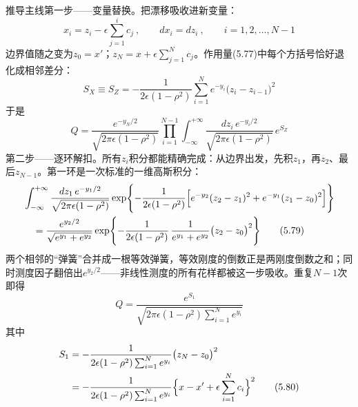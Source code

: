 推导主线第一步——变量替换。把漂移吸收进新变量：
\begin{equation*}
x_i=z_i-\epsilon\sum_{j=1}^{i}c_j\ ,\qquad dx_i=dz_i\ ,\qquad
i=1,2,\ldots,N-1
\end{equation*}
边界值随之变为$z_0=x'$；$z_N=x+\epsilon\sum_{j=1}^{N}c_j$。作用量(5.77)中每个方括号恰好退化成相邻差分：
\begin{equation*}
S_{X}\equiv S_{Z}=-\frac{1}{2\epsilon(1-\rho^{2})}\sum_{i=1}^{N}
e^{-y_i}\bigl(z_i-z_{i-1}\bigr)^{2}
\tag{5.78}
\end{equation*}
于是
\begin{equation*}
Q=\frac{e^{-y_N/2}}{\sqrt{2\pi\epsilon(1-\rho^{2})}}
\prod_{i=1}^{N-1}\int_{-\infty}^{+\infty}
\frac{dz_i\,e^{-y_i/2}}{\sqrt{2\pi\epsilon(1-\rho^{2})}}\,e^{S_{Z}}
\end{equation*}
第二步——逐环解扣。所有$z_i$积分都能精确完成：从边界出发，先积$z_1$，再$z_2$、最后$z_{N-1}$。第一环是一次标准的一维高斯积分：
\begin{align*}
&\int_{-\infty}^{+\infty}\frac{dz_1\,e^{-y_1/2}}{\sqrt{2\pi\epsilon(1-\rho^{2})}}
\exp\Biggl\{-\frac{1}{2\epsilon(1-\rho^{2})}\Bigl[
e^{-y_2}(z_2-z_1)^{2}+e^{-y_1}(z_1-z_0)^{2}\Bigr]\Biggr\}\\
&\quad=\frac{e^{y_2/2}}{\sqrt{e^{y_1}+e^{y_2}}}
\exp\Biggl\{-\frac{1}{2\epsilon(1-\rho^{2})}\,
\frac{1}{e^{y_1}+e^{y_2}}\bigl(z_2-z_0\bigr)^{2}\Biggr\}
\tag{5.79}
\end{align*}
两个相邻的“弹簧”合并成一根等效弹簧，等效刚度的倒数正是两刚度倒数之和；同时测度因子翻倍出$e^{y_2/2}$——非线性测度的所有花样都被这一步吸收。重复$N-1$次即得
\begin{equation*}
Q=\frac{e^{S_1}}{\sqrt{2\pi\epsilon(1-\rho^{2})\sum_{i=1}^{N}e^{y_i}}}
\end{equation*}
其中
\begin{align*}
S_{1}&=-\frac{1}{2\epsilon(1-\rho^{2})\sum_{i=1}^{N}e^{y_i}}
\bigl(z_N-z_0\bigr)^{2}\\
&=-\frac{1}{2\epsilon(1-\rho^{2})\sum_{i=1}^{N}e^{y_i}}
\Bigl\{x-x'+\epsilon\sum_{i=1}^{N}c_i\Bigr\}^{2}
\tag{5.80}
\end{align*}


